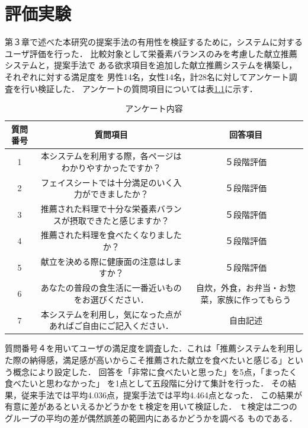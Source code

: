 \documentclass[11pt,titlepage,uplatex]{ujreport}
\begin{document}
\chapter{評価実験}
第３章で述べた本研究の提案手法の有用性を検証するために，システムに対する
ユーザ評価を行った．
比較対象として栄養素バランスのみを考慮した献立推薦システムと，提案手法で
ある欲求項目を追加した献立推薦システムを構築し，それぞれに対する満足度を
男性14名，女性14名，計28名に対してアンケート調査を行い検証した．
アンケートの質問項目については表\ref{tab:アンケート}に示す．
\begin{table}[tbh]
  \caption{アンケート内容}
  \label{tab:アンケート}
  \centering
  \tiny
    \begin{tabular}{c|c|c}
      \hline
      質問番号 & 質問項目 & 回答項目\\
      \hline
      1 & 本システムを利用する際，各ページはわかりやすかったですか？ & ５段階評価\\
      2 & フェイスシートでは十分満足のいく入力ができましたか？ & ５段階評価\\
      3 & 推薦された料理で十分な栄養素バランスが摂取できたと感じますか？ & ５段階評価\\
      4 & 推薦された料理を食べたくなりましたか？ & ５段階評価\\
      5 & 献立を決める際に健康面の注意はしますか？ & ５段階評価\\      
      6 & あなたの普段の食生活に一番近いものをお選びください． & 自炊，外食，お弁当・お惣菜，家族に作ってもらう \\
      7 & 本システムを利用し，気になった点があればご自由にご記入ください． & 自由記述 \\
      \hline
    \end{tabular}
\end{table}
\noindent
質問番号４を用いてユーザの満足度を調査した．これは「推薦システムを利用し
た際の納得感，満足感が高いからこそ推薦された献立を食べたいと感じる」とい
う概念により設定した．
回答を「非常に食べたいと思った」を5点，「まったく食べたいと思わなかった」
を1点として五段階に分けて集計を行った．
その結果，従来手法では平均4.036点，提案手法では平均4.464点となった．
この結果が有意に差があるといえるかどうかをｔ検定を用いて検証した．
ｔ検定は二つのグループの平均の差が偶然誤差の範囲内にあるかどうかを調べる
ものである．
\end{document}
